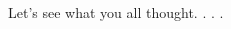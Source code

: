\documentclass[aspectratio=169]{beamer}
\begin{document}
\begin{frame}

Let's see what you all thought. . . .

\end{frame}
\begin{frame}


\begin{center}
\begin{columns}
\begin{column}{0.6\textwidth}
\begin{center}

\end{center}
\end{column}
\end{columns}
\end{center}
\end{frame}
\end{document}
